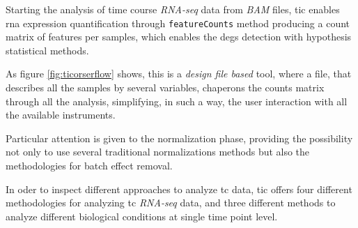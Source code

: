 Starting the analysis of time course \textit{RNA-seq} data from \textit{BAM} files, \gls{tic} enables \gls{rna} expression quantification through \lstinline!featureCounts! method \cite{Liao2014} producing a count matrix of features per samples, which enables the \glspl{deg} detection with hypothesis statistical methods.

As figure \ref{fig:ticorserflow} shows, this is a \textit{design file based} tool, where a file, that describes all the samples by several variables, chaperons the counts matrix through all the analysis, simplifying, in such a way, the user interaction with all the available instruments.
 
Particular attention is given to the normalization phase, providing the possibility not only to use several traditional normalizations methods but also the methodologies for batch effect removal.

In oder to inspect different approaches to analyze \gls{tc} data, \gls{tic} offers four different methodologies for analyzing \gls{tc} \textit{RNA-seq} data, and three different methods to analyze different biological conditions at single time point level.

